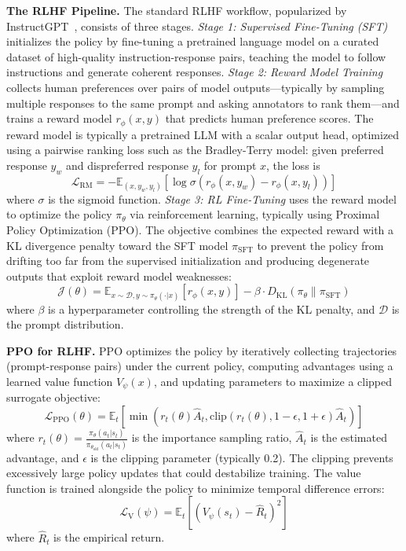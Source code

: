 \documentclass[conference]{IEEEtran}
\begin{document}
\textbf{The RLHF Pipeline.} The standard RLHF workflow, popularized by InstructGPT~\cite{instructgpt-paper}, consists of three stages. \textit{Stage 1: Supervised Fine-Tuning (SFT)} initializes the policy by fine-tuning a pretrained language model on a curated dataset of high-quality instruction-response pairs, teaching the model to follow instructions and generate coherent responses. \textit{Stage 2: Reward Model Training} collects human preferences over pairs of model outputs—typically by sampling multiple responses to the same prompt and asking annotators to rank them—and trains a reward model $r_\phi(x, y)$ that predicts human preference scores. The reward model is typically a pretrained LLM with a scalar output head, optimized using a pairwise ranking loss such as the Bradley-Terry model: given preferred response $y_w$ and dispreferred response $y_l$ for prompt $x$, the loss is
\[
\mathcal{L}_{\text{RM}} = -\mathbb{E}_{(x, y_w, y_l)} \left[ \log \sigma(r_\phi(x, y_w) - r_\phi(x, y_l)) \right]
\]
where $\sigma$ is the sigmoid function. \textit{Stage 3: RL Fine-Tuning} uses the reward model to optimize the policy $\pi_\theta$ via reinforcement learning, typically using Proximal Policy Optimization (PPO). The objective combines the expected reward with a KL divergence penalty toward the SFT model $\pi_{\text{SFT}}$ to prevent the policy from drifting too far from the supervised initialization and producing degenerate outputs that exploit reward model weaknesses:
\[
\mathcal{J}(\theta) = \mathbb{E}_{x \sim \mathcal{D}, y \sim \pi_\theta(\cdot|x)} \left[ r_\phi(x, y) \right] - \beta \cdot D_{\text{KL}}(\pi_\theta \| \pi_{\text{SFT}})
\]
where $\beta$ is a hyperparameter controlling the strength of the KL penalty, and $\mathcal{D}$ is the prompt distribution.

\textbf{PPO for RLHF.} PPO optimizes the policy by iteratively collecting trajectories (prompt-response pairs) under the current policy, computing advantages using a learned value function $V_\psi(x)$, and updating parameters to maximize a clipped surrogate objective:
\[
\mathcal{L}_{\text{PPO}}(\theta) = \mathbb{E}_t \left[ \min\left( r_t(\theta) \hat{A}_t, \text{clip}(r_t(\theta), 1-\epsilon, 1+\epsilon) \hat{A}_t \right) \right]
\]
where $r_t(\theta) = \frac{\pi_\theta(a_t | s_t)}{\pi_{\theta_{\text{old}}}(a_t | s_t)}$ is the importance sampling ratio, $\hat{A}_t$ is the estimated advantage, and $\epsilon$ is the clipping parameter (typically 0.2). The clipping prevents excessively large policy updates that could destabilize training. The value function is trained alongside the policy to minimize temporal difference errors:
\[
\mathcal{L}_{\text{V}}(\psi) = \mathbb{E}_t \left[ (V_\psi(s_t) - \hat{R}_t)^2 \right]
\]
where $\hat{R}_t$ is the empirical return.
\end{document}
